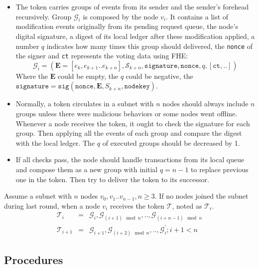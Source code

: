 \documentclass[11pt]{article}
\begin{document}
\begin{itemize}
\item The token carries groups of events from its sender and the sender{'}s forehead recursively.
Group $\mathcal{G}_{i}$ is composed by the node $v_{i}$. It contains a list of modification events originally from its pending request queue, the node{'}s digital signature, a digest of its local ledger after these modification applied, a number $q$ indicates how many times this group should delivered, the \texttt{nonce} of the signer and \texttt{ct} represents the voting data using FHE:
\begin{equation}
\mathcal{G}_{i} = (\mathbf{E} = [e_{k}, e_{k+1}..e_{k+n}], \mathcal{S}_{k+n}, \texttt{signature}, \texttt{nonce}, q, [\texttt{ct},..])
\end{equation}
Where the $\mathbf{E}$ could be empty, the $q$ could be negative, the \(\texttt{signature} = \texttt{sig}(\texttt{nonce}, \mathbf{E}, S_{k+n}, \texttt{nodekey})\).

\item Normally, a token circulates in a subnet with $n$ nodes should always include $n$ groups unless there were malicious behaviors or some nodes went offline.
Whenever a node receives the token, it ought to check the signature for each group.
Then applying all the events of each group and compare the digest with the local ledger.
The $q$ of executed groups should be decreased by 1.

\item If all checks pass, the node should handle transactions from its local queue and compose them as a new group with initial $q=n-1$ to replace previous one in the token.
Then try to deliver the token to its successor.
\end{itemize}

Assume a subnet with $n$ nodes \( v_{0}, v_{1} .. v_{n-1}, n\geq 3\). If no nodes joined the subnet during last round, when a node $v_{i}$ receives the token $\mathcal{T}$, noted as $\mathcal{T}_{i}$.
\begin{eqnarray}
\mathcal{T}_{i} &=& \mathcal{G}_{i}, \mathcal{G}_{(i + 1)\mod n},.., \mathcal{G}_{(i + n - 1)\mod n}\\
\mathcal{T}_{i+1} &=& \mathcal{G}_{i+1}, \mathcal{G}_{(i+2)\mod n},.., \mathcal{G}_{i}^{\prime}; i+1<n
\end{eqnarray}

\subsection{Procedures}
\end{document}
